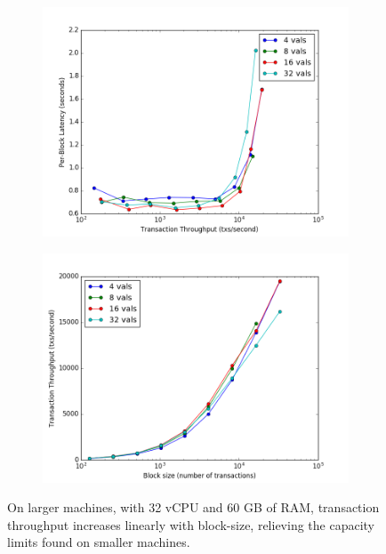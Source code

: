 \begin{figure}[]
	\centering
	\begin{subfigure}{0.8 \textwidth}
		\includegraphics[width=\linewidth,height=\textheight,keepaspectratio]{figures/throughput/large_instances/latency-throughput.png}
		\centering
	\end{subfigure}

	\begin{subfigure}{0.8 \textwidth}
		\includegraphics[width=\linewidth,height=\textheight,keepaspectratio]{figures/throughput/large_instances/throughput-blocksize.png}
	\end{subfigure}
	\centering
	\caption[Throughput-blocksize in non-faulty global network on large machines]{On larger machines, 
with 32 vCPU and 60 GB of RAM, transaction throughput increases linearly with block-size, 
relieving the capacity limits found on smaller machines.}
	\label{fig:exp:throughput:large}
\end{figure}

